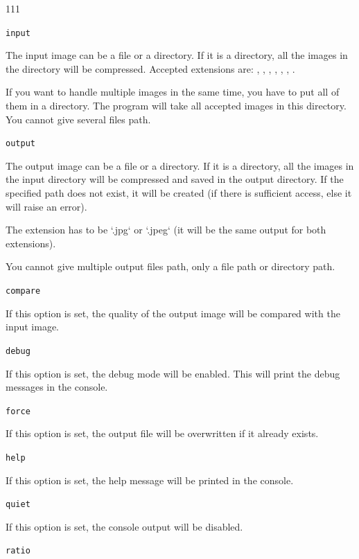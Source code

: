 \begin{dinglist}{111}
    \item \texttt{input}

    The input image can be a file or a directory. If it is a directory, all the images in the directory will be compressed.
    Accepted extensions are:
    , , , , , , .

    If you want to handle multiple images in the same time, you have to put all of them in a directory.
    The program will take all accepted images in this directory.
    You cannot give several files path.

    \item \texttt{output}

    The output image can be a file or a directory. If it is a directory, all the images in the input directory will be compressed and saved in the output directory.
    If the specified path does not exist, it will be created (if there is sufficient access, else it will raise an error).

    The extension has to be `.jpg` or `.jpeg` (it will be the same output for both extensions).

    You cannot give multiple output files path, only a file path or directory path.

    \item \texttt{compare}

    If this option is set, the quality of the output image will be compared with the input image.

    \item \texttt{debug}

    If this option is set, the debug mode will be enabled. This will print the debug messages in the console.

    \item \texttt{force}

    If this option is set, the output file will be overwritten if it already exists.

    \item \texttt{help}

    If this option is set, the help message will be printed in the console.

    \item \texttt{quiet}

    If this option is set, the console output will be disabled.

    \item \texttt{ratio}


\end{dinglist}
